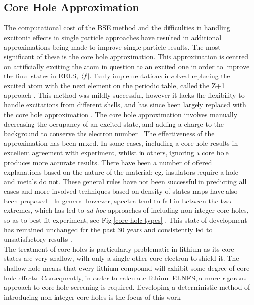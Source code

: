 \subsection{Core Hole Approximation} \label{Core Hole Approximation}
The computational cost of the BSE method and the difficulties in handling excitonic effects in  single particle approaches have resulted in additional approximations being made to improve single particle results.  The most significant of these is the core hole approximation.  This approximation is centred on artificially exciting the atom in question to an excited one in order to improve the final states in EELS, $\bra{f}$.  Early implementations involved replacing the excited atom with the next element on the periodic table, called the Z+1 approach \cite{lee_new_1977}.  This method was mildly successful, however it lacks the flexibility to handle excitations from different shells, and has since been largely replaced with the core hole approximation \cite{hebert_practical_2007}.  The core hole approximation involves manually decreasing the occupancy of an excited state, and adding a charge to the background to conserve the electron number \cite{wien2k}. The effectiveness of the approximation has been mixed.  In some cases, including a core hole results in excellent agreement with experiment, whilst in others, ignoring a core hole produces more accurate results.   There have been a number of offered explanations based on the nature of the material: eg. insulators require a hole and metals do not.  These general rules have not been successful in predicting all cases and more involved techniques based on density of states maps have also been proposed \cite{mauchamp_core-hole_2009}.  In general however, spectra tend to fall in between the two extremes, which has led to \textit{ad hoc} approaches of including non integer core holes, so as to best fit experiment, see Fig \ref{core-hole-types} \cite{hebert_practical_2007, luitz_partial_2001, hebert_improvement_2003, slater_energy_1964}. This state of development has remained unchanged for the past 30 years and consistently led to unsatisfactory results \cite{ brydson_further_1988, hardcastle_robust_2017,bad_hole1,bad_hole2, bad_hole3, bad_hole4, bad_hole5, bad_hole6, bad_hole7, bad_hole8,bad_hole9, bad_hole10}. \\

The treatment of core holes is particularly problematic in lithium as its core states are very shallow, with only a single other core electron to shield it.  The shallow  hole means that every lithium compound will exhibit some degree of core hole effects.  Consequently, in order to  calculate lithium ELNES, a more rigorous approach to core hole screening is required.  Developing a deterministic method of introducing non-integer core holes is the focus of this work


